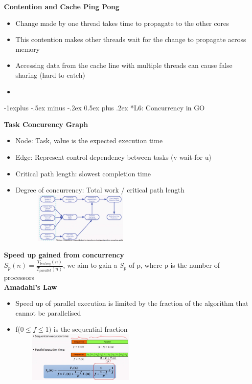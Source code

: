 \documentclass[10pt, landscape]{article}
\makeatletter
\renewcommand{\subsection}{\@startsection{subsection}{2}{0mm}%
                                {-1explus -.5ex minus -.2ex}%
                                {0.5ex plus .2ex}%
                                {\normalfont\normalsize\bfseries}}
\makeatother
\begin{document}
\begin{multicols}{4}
\textbf{Contention and Cache Ping Pong} \\
\begin{itemize}
    \item Change made by one thread takes time to propagate to the other cores
    \item This contention makes other threads wait for the change to propagate across memory
    \item Accessing data from the cache line with multiple threads can cause false sharing (hard to catch) 
    \item 
\end{itemize}

\subsection*{L6: Concurrency in GO} 

\textbf{Task Concurency Graph} \\
\begin{itemize}
    \item Node: Task, value is the expected execution time 
    \item Edge: Represent control dependency between tasks (v wait-for u)
    \item Critical path length: slowest completion time 
    \item Degree of concurrency: Total work / critical path length 
    \includegraphics*[width=7cm,height=2.5cm]{taskconcurrency.png}\\
\end{itemize}

\textbf{Speed up gained from concurrency} \\
$S_p(n) = \frac{T_{best seq}(n)}{T_{parallel}(n)}$, we aim to gain a $S_p$ of p, where p is the number of processors \\

\textbf{Amadahl's Law} \\
\begin{itemize}
    \item Speed up of parallel execution is limited by the fraction of the algorithm that cannot be parallelised
    \item f($0\le f \le 1)$ is the sequential fraction
    \includegraphics*[width=7cm,height=2.5cm]{amdahl.png}\\
\end{itemize}



\end{multicols}
\end{document}
